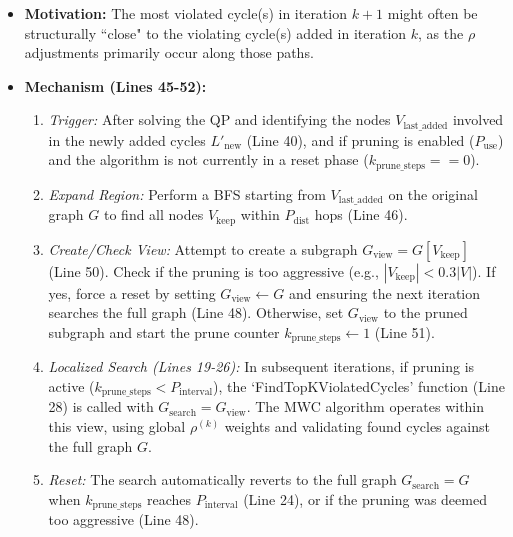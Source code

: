 \documentclass{article}
\begin{document}
\begin{itemize}
    \item \textbf{Motivation:} The most violated cycle(s) in iteration $k+1$ might often be structurally ``close" to the violating cycle(s) added in iteration $k$, as the $\rho$ adjustments primarily occur along those paths.
    \item \textbf{Mechanism (Lines 45-52):}
        \begin{enumerate}
            \item \textit{Trigger:} After solving the QP and identifying the nodes $V_{\text{last\_added}}$ involved in the newly added cycles $L'_{\text{new}}$ (Line 40), and if pruning is enabled ($P_{\text{use}}$) and the algorithm is not currently in a reset phase ($k_{\text{prune\_steps}} == 0$).
            \item \textit{Expand Region:} Perform a BFS starting from $V_{\text{last\_added}}$ on the original graph $G$ to find all nodes $V_{\text{keep}}$ within $P_{\text{dist}}$ hops (Line 46).
            \item \textit{Create/Check View:} Attempt to create a subgraph $G_{\text{view}} = G[V_{\text{keep}}]$ (Line 50). Check if the pruning is too aggressive (e.g., $|V_{\text{keep}}| < 0.3 |V|$). If yes, force a reset by setting $G_{\text{view}} \gets G$ and ensuring the next iteration searches the full graph (Line 48). Otherwise, set $G_{\text{view}}$ to the pruned subgraph and start the prune counter $k_{\text{prune\_steps}} \gets 1$ (Line 51).
            \item \textit{Localized Search (Lines 19-26):} In subsequent iterations, if pruning is active ($k_{\text{prune\_steps}} < P_{\text{interval}}$), the `FindTopKViolatedCycles' function (Line 28) is called with $G_{\text{search}} = G_{\text{view}}$. The MWC algorithm operates within this view, using global $\rho^{(k)}$ weights and validating found cycles against the full graph $G$.
            \item \textit{Reset:} The search automatically reverts to the full graph $G_{\text{search}} = G$ when $k_{\text{prune\_steps}}$ reaches $P_{\text{interval}}$ (Line 24), or if the pruning was deemed too aggressive (Line 48).
        \end{enumerate}
\end{itemize}
\end{document}
